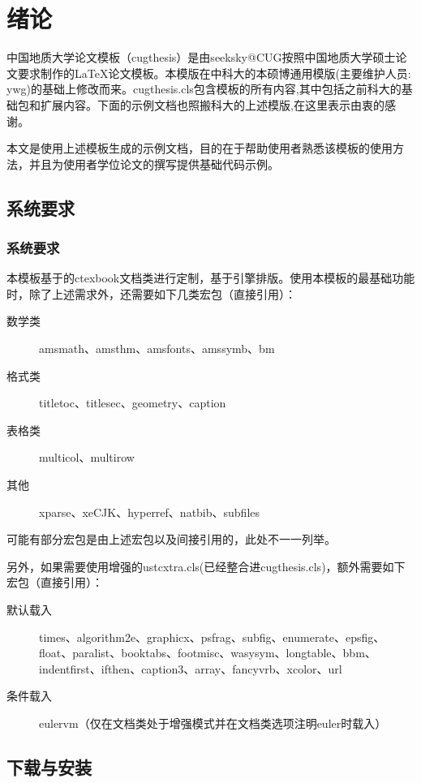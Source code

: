 ﻿
\chapter{绪论}
\label{chap:introduction}

中国地质大学论文模板（cugthesis）是由seeksky@CUG按照中国地质大学硕士论文要求制作的\LaTeX 论文模板。本模版在中科大的本硕博通用模版(主要维护人员: ywg)的基础上修改而来。cugthesis.cls包含模板的所有内容,其中包括之前科大的基础包和扩展内容。下面的示例文档也照搬科大的上述模版,在这里表示由衷的感谢。

本文是使用上述模板生成的示例文档，目的在于帮助使用者熟悉该模板的使用方法，并且为使用者学位论文的撰写提供基础代码示例。

\section{系统要求}
\subsection{系统要求}
本模板基于\CTeX 的ctexbook文档类进行定制，基于\XeTeX 引擎排版。使用本模板的最基础功能时，除了上述需求外，还需要如下几类宏包（直接引用）：
\begin{description}
\item[数学类]{amsmath、amsthm、amsfonts、amssymb、bm}
\item[格式类]{titletoc、titlesec、geometry、caption}
\item[表格类]{multicol、multirow}
\item[其他]{xparse、xeCJK、hyperref、natbib、subfiles}
\end{description}
可能有部分宏包是由上述宏包以及\CTeX 间接引用的，此处不一一列举。

另外，如果需要使用增强的ustcxtra.cls(已经整合进cugthesis.cls)，额外需要如下宏包（直接引用）：
\begin{description}
\item[默认载入]{times、algorithm2e、graphicx、psfrag、subfig、enumerate、epsfig、float、paralist、booktabs、footmisc、wasysym、longtable、bbm、indentfirst、ifthen、caption3、array、fancyvrb、xcolor、url}
\item[条件载入]{eulervm（仅在文档类处于增强模式并在文档类选项注明euler时载入）}
\end{description}

\section{下载与安装}
